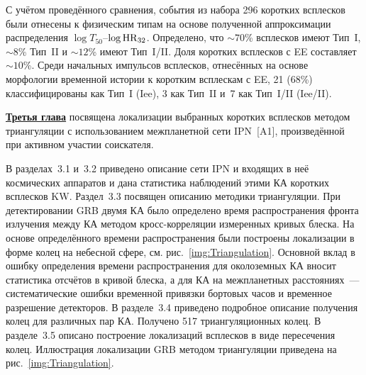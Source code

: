 С учётом проведённого сравнения, события из набора 296 коротких всплесков 
были отнесены к физическим типам на основе полученной аппроксимации 
распределения $\log T_{50}$--$\log {\mathrm{HR}}_{32}$. 
Определено, что $\sim 70$\% всплесков имеют Тип~I, 
$\sim 8$\% Тип~II и $\sim 12$\% имеют Тип~I/II. 
Доля коротких всплесков с EE составляет $\sim 10$\%.
Среди начальных импульсов всплесков, отнесённых на основе морфологии временной 
истории к коротким всплескам с EE, 21 (68\%) классифицированы как Тип~I (Iee), 3 как Тип~II 
и~7 как Тип~I/II (Iee/II).

\FloatBarrier

\underline{\textbf{Третья глава}} посвящена локализации выбранных коротких всплесков 
методом триангуляции с использованием межпланетной сети IPN~[A1], 
произведённой при активном участии соискателя. 

В разделах~3.1 и~3.2 приведено описание сети IPN и входящих в неё космических 
аппаратов и дана статистика наблюдений этими КА коротких всплесков KW. 
Раздел~3.3 посвящен описанию методики триангуляции. При детектировании GRB двумя КА 
было определено время распространения фронта излучения между КА методом кросс-корреляции 
измеренных кривых блеска. На основе определённого времени распространения
были построены локализации в форме колец на небесной сфере, см. рис.~\ref{img:Triangulation}.
Основной вклад в ошибку определения времени распространения для околоземных КА вносит
статистика отсчётов в кривой блеска, а для КА на межпланетных расстояниях~--- систематические 
ошибки временной привязки бортовых часов и временное разрешение детекторов.
В разделе~3.4 приведено подробное описание получения
колец для различных пар КА. Получено 517 триангуляционных колец.
В разделе~3.5 описано построение локализаций всплесков в виде пересечения колец. 
Иллюстрация локализации GRB методом триангуляции приведена на рис.~\ref{img:Triangulation}. 


